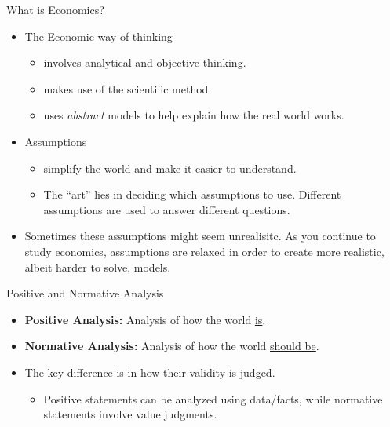 \documentclass[xcolor={dvipsnames},pdf, hyperref={colorlinks=true, citecolor=ForestGreen, linkcolor=BlueViolet, urlcolor=Magenta}]{beamer}
\newcommand{\defn}[1]{\textbf{#1}}
\begin{document}
\begin{frame}{What is Economics?}
	
	\begin{itemize}
		\item The Economic way of thinking
			\begin{itemize}
					\item involves analytical and objective thinking.
					\item makes use of the scientific method.
					\item uses \textit{abstract} models to help explain how the real world works.
			\end{itemize}
		\item Assumptions
			\begin{itemize}
				\item simplify the world and make it easier to understand.
				\item The ``art'' lies in deciding which assumptions to use. Different assumptions are used to answer different questions.
			\end{itemize}
		\item Sometimes these assumptions might seem unrealisitc. As you continue to study economics, assumptions are relaxed in order to create more realistic, albeit harder to solve, models.
	\end{itemize}
	
\end{frame}

\begin{frame}{Positive and Normative Analysis}
	\begin{itemize}
		\item \defn{Positive Analysis:} Analysis of how the world \underline{is}.
	
		\item \defn{Normative Analysis:} Analysis of how the world \underline{should be}.
	
		\item The key difference is in how their validity is judged.
		 \begin{itemize}
		 	\item Positive statements can be analyzed using data/facts, while normative statements involve value judgments.
		 \end{itemize}
	\end{itemize}
\end{frame}
\end{document}

